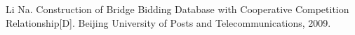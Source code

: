 \documentclass[11pt]{article}
\begin{document}




\begin{thebibliography}{9}
Li Na. Construction of Bridge Bidding Database with Cooperative Competition Relationship[D]. Beijing University of Posts and Telecommunications, 2009.
\end{thebibliography}
\end{document}

